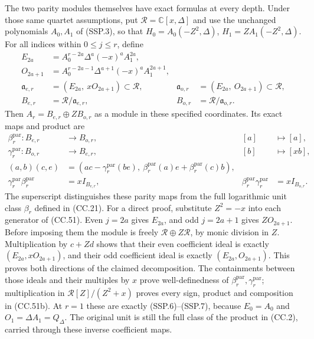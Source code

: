 The two parity modules themselves have exact formulas at every depth.
Under those same quartet assumptions, put
\(\mathcal R=\mathbb C[x,\Delta]\) and use the unchanged
polynomials \(A_0,A_1\) of (SSP.3), so that
\(H_0=A_0(-Z^2,\Delta)\), \(H_1=ZA_1(-Z^2,\Delta)\).
For all indices within \(0\le j\le r\), define
\[
 \begin{aligned}
 E_{2a}&=A_0^{r-2a}\Delta^a(-x)^a A_1^{2a},\\
 O_{2a+1}&=A_0^{r-2a-1}\Delta^{a+1}(-x)^a A_1^{2a+1},\\
 \mathfrak a_{e,r}&=(E_{2a},\ xO_{2a+1})\subset\mathcal R,
 &\mathfrak a_{o,r}&=(E_{2a},\ O_{2a+1})\subset\mathcal R,\\
 B_{e,r}&=\mathcal R/\mathfrak a_{e,r},
 & B_{o,r}&=\mathcal R/\mathfrak a_{o,r}.
 \end{aligned}\tag{CC.51a}
\]
Then \(A_r=B_{e,r}\oplus ZB_{o,r}\) as a module in these
specified coordinates.  Its exact maps and product are
\[
 \begin{aligned}
 \beta_r^{\mathrm{par}}:B_{e,r}&\to B_{o,r},& [a]&\mapsto[a],\\
 \gamma_r^{\mathrm{par}}:B_{o,r}&\to B_{e,r},& [b]&\mapsto[xb],\\
 (a,b)(c,e)&=(ac-\gamma_r^{\mathrm{par}}(be),\
       \beta_r^{\mathrm{par}}(a)e+\beta_r^{\mathrm{par}}(c)b),\\
 \gamma_r^{\mathrm{par}}\beta_r^{\mathrm{par}}&=xI_{B_{e,r}},&
 \beta_r^{\mathrm{par}}\gamma_r^{\mathrm{par}}&=xI_{B_{o,r}}.
 \end{aligned}\tag{CC.51b}
\]
The superscript distinguishes these parity maps from the full
logarithmic unit class \(\beta_r\) defined in (CC.21).
For a direct proof, substitute
\(Z^2=-x\) into each generator of (CC.51).  Even \(j=2a\)
gives \(E_{2a}\), and odd \(j=2a+1\) gives \(ZO_{2a+1}\).
Before imposing them the module is freely
\(\mathcal R\oplus Z\mathcal R\), by monic division in \(Z\).
Multiplication by \(c+Zd\) shows that their even coefficient
ideal is exactly \((E_{2a},xO_{2a+1})\), and their odd
coefficient ideal is exactly \((E_{2a},O_{2a+1})\).
This proves both directions of the claimed decomposition.
The containments between those ideals and their multiples by
\(x\) prove well-definedness of \(\beta_r^{\mathrm{par}},
\gamma_r^{\mathrm{par}}\);
multiplication in \(\mathcal R[Z]/(Z^2+x)\) proves every sign,
product and composition in (CC.51b).  At \(r=1\) these are
exactly (SSP.6)--(SSP.7), because
\(E_0=A_0\) and \(O_1=\Delta A_1=Q_\Delta\).
The original unit is still the full class of the product in
(CC.2), carried through these inverse coefficient maps.


